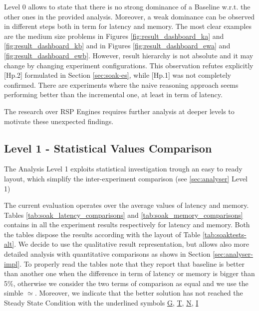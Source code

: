 Level 0 allows to state that there is no strong dominance of a Baseline w.r.t. the other ones in the provided analysis. Moreover, a weak dominance can be observed in different steps both in term for latency  and memory. The most clear examples are the medium size problems in Figures \ref{fig:result_dashboard_ka} and \ref{fig:result_dashboard_kb} and in Figures \ref{fig:result_dashboard_ewa} and \ref{fig:result_dashboard_ewb}. However, result hierarchy is not absolute and it may change by changing experiment configurations. This observation refutes explicitly [Hp.2] formulated in Section \ref{sec:soak-es}, while [Hp.1] was not completely confirmed. There are experiments where the naive  reasoning  approach seems performing better than the incremental one, at least in term of latency. 

The research over RSP Engines requires further analysis at deeper levels to motivate these unexpected findings.

%

\pagebreak
\subsection{Level 1 - Statistical Values Comparison}\label{sec:eval-level1}

The Analysis Level 1 exploits statistical investigation trough an easy to ready layout, which simplify the inter-experiment comparison (see \ref{sec:analyser} Level 1)

The current evaluation operates over the average values of latency and memory. Tables \ref{tab:soak_latency_comparisons} and \ref{tab:soak_memory_comparisons} contains in all the experiment results respectively for latency and memory.  Both the tables dispose the results according with the layout of Table \ref{tab:soaktests-alt}. We decide to use the qualitative result representation, but \name allows also more detailed analysis with quantitative comparisons as shows in Section \ref{sec:analyser-impl}. To properly read the tables note that they report that baseline is better than another one when the difference in term of latency or memory is bigger than 5\%, otherwise we consider the two terms of comparison as equal and we use the simble $\simeq$.
Moreover, we indicate that the better solution has not reached the Steady State Condition with the underlined symbols \underline{G}, \underline{T}, \underline{N}, \underline{I}



